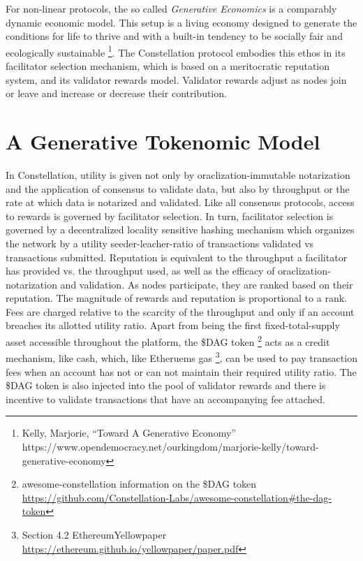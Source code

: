 \documentclass{article}
\begin{document}
For non-linear protocols, the so called {\emph{Generative Economics}} is a comparably dynamic economic model. This setup is a living economy designed to generate the conditions for life to thrive and with a built-in tendency to be socially fair and ecologically sustainable
\footnote{Kelly, Marjorie, ``Toward A Generative Economy'' \\ https://www.opendemocracy.net/ourkingdom/marjorie-kelly/toward-generative-economy}. 
The Constellation protocol embodies this ethos in its facilitator selection mechanism, which is based on a meritocratic reputation system, and its validator rewards model. Validator rewards adjust as nodes join or leave and increase or decrease their contribution.

\section{A Generative Tokenomic Model}
In Constellation, utility is given not only by oraclization-immutable notarization and the application of consensus to validate data, but also by throughput or the rate at which data is notarized and validated. Like all consensus protocols, access to rewards is governed by facilitator selection. In turn, facilitator selection is governed by a decentralized locality sensitive hashing mechanism which organizes the network by a utility seeder-leacher-ratio of transactions validated vs transactions submitted. Reputation is equivalent to the throughput a facilitator has provided vs. the throughput used, as well as the efficacy of oraclization-notarization and validation. As nodes participate, they are ranked based on their reputation. The magnitude of rewards and reputation is proportional to a rank. Fees are charged relative to the scarcity of the throughput and only if an account breaches its allotted utility ratio. Apart from being the first fixed-total-supply asset accessible throughout the platform, the \$DAG token 
\footnote{awesome-constellation information on the \$DAG token\\ \url{https://github.com/Constellation-Labs/awesome-constellation\#the-dag-token}} 
acts as a credit mechanism, like cash, which, like Etheruems gas
\footnote{Section 4.2 EthereumYellowpaper\\ \url{https://ethereum.github.io/yellowpaper/paper.pdf}}, 
can be used to pay transaction fees when an account has not or can not maintain their required utility ratio. 
The \$DAG token is also injected into the pool of validator rewards and there is incentive to validate transactions that have an accompanying fee attached. 
\end{document}
